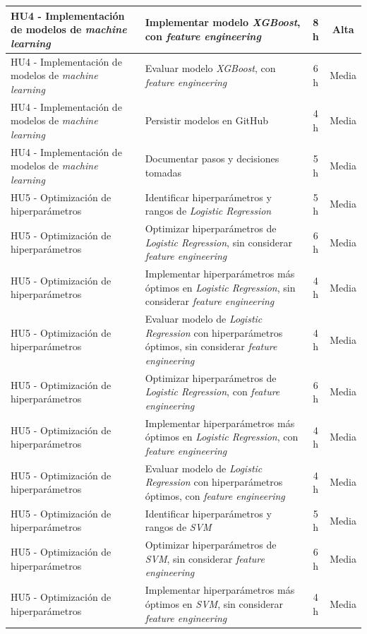 \documentclass[
11pt, %
]{charter}
\begin{document}
\begin{xltabular}{\linewidth}{@{}|X|X|c|c|@{}}
HU4 - Implementación de modelos de \textit{machine learning} & Implementar modelo \textit{XGBoost}, con \textit{feature engineering} & 8 h & Alta \\ \hline
HU4 - Implementación de modelos de \textit{machine learning} & Evaluar modelo \textit{XGBoost}, con \textit{feature engineering} & 6 h & Media \\ \hline
HU4 - Implementación de modelos de \textit{machine learning} & Persistir modelos en GitHub & 4 h & Media \\ \hline
HU4 - Implementación de modelos de \textit{machine learning} & Documentar pasos y decisiones tomadas & 5 h & Media \\ \hline
HU5 - Optimización de hiperparámetros & Identificar hiperparámetros y rangos de \textit{Logistic Regression} & 5 h & Media \\ \hline
HU5 - Optimización de hiperparámetros & Optimizar hiperparámetros de \textit{Logistic Regression}, sin considerar \textit{feature engineering} & 6 h & Media \\ \hline
HU5 - Optimización de hiperparámetros & Implementar hiperparámetros más óptimos en \textit{Logistic Regression}, sin considerar \textit{feature engineering} & 4 h & Media \\ \hline
HU5 - Optimización de hiperparámetros & Evaluar modelo de \textit{Logistic Regression} con hiperparámetros óptimos, sin considerar \textit{feature engineering} & 4 h & Media \\ \hline
HU5 - Optimización de hiperparámetros & Optimizar hiperparámetros de \textit{Logistic Regression}, con \textit{feature engineering} & 6 h & Media \\ \hline
HU5 - Optimización de hiperparámetros & Implementar hiperparámetros más óptimos en \textit{Logistic Regression}, con \textit{feature engineering} & 4 h & Media \\ \hline
HU5 - Optimización de hiperparámetros & Evaluar modelo de \textit{Logistic Regression} con hiperparámetros óptimos, con \textit{feature engineering} & 4 h & Media \\ \hline
HU5 - Optimización de hiperparámetros & Identificar hiperparámetros y rangos de \textit{SVM} & 5 h & Media \\ \hline
HU5 - Optimización de hiperparámetros & Optimizar hiperparámetros de \textit{SVM}, sin considerar \textit{feature engineering} & 6 h & Media \\ \hline
HU5 - Optimización de hiperparámetros & Implementar hiperparámetros más óptimos en \textit{SVM}, sin considerar \textit{feature engineering} & 4 h & Media \\ \hline

\end{xltabular}
\end{document}
